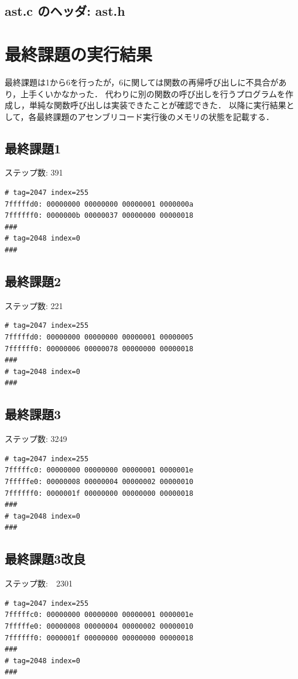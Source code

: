 \documentclass[a4paper,11pt]{jarticle}
\begin{document}
{\subsection{ast.c のヘッダ: ast.h}

\section{最終課題の実行結果}
最終課題は1から6を行ったが，6に関しては関数の再帰呼び出しに不具合があり，上手くいかなかった．
代わりに別の関数の呼び出しを行うプログラムを作成し，単純な関数呼び出しは実装できたことが確認できた．
以降に実行結果として，各最終課題のアセンブリコード実行後のメモリの状態を記載する．
\subsection{最終課題1}
ステップ数: 391 
\begin{verbatim}
# tag=2047 index=255
7fffffd0: 00000000 00000000 00000001 0000000a
7ffffff0: 0000000b 00000037 00000000 00000018
###
# tag=2048 index=0
###
\end{verbatim}
\subsection{最終課題2}
ステップ数: 221 
\begin{verbatim}
# tag=2047 index=255
7fffffd0: 00000000 00000000 00000001 00000005
7ffffff0: 00000006 00000078 00000000 00000018
###
# tag=2048 index=0
###
\end{verbatim}
\subsection{最終課題3}
ステップ数: 3249 
\begin{verbatim}
# tag=2047 index=255
7fffffc0: 00000000 00000000 00000001 0000001e
7fffffe0: 00000008 00000004 00000002 00000010
7ffffff0: 0000001f 00000000 00000000 00000018
###
# tag=2048 index=0
###
\end{verbatim}
\subsection{最終課題3改良}
ステップ数:　2301
\begin{verbatim}
# tag=2047 index=255
7fffffc0: 00000000 00000000 00000001 0000001e
7fffffe0: 00000008 00000004 00000002 00000010
7ffffff0: 0000001f 00000000 00000000 00000018
###
# tag=2048 index=0
###


\end{verbatim}}
\end{document}
